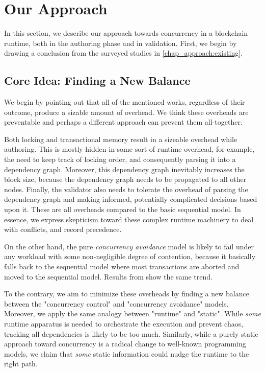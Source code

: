 \section{Our Approach} \label{chap_desgin:sec:our_approach}

In this section, we describe our approach towards concurrency in a blockchain runtime, both in the
authoring phase and in validation. First, we begin by drawing a conclusion from the surveyed studies
in \ref{chap_approach:existing}.

\subsection{Core Idea: Finding a New Balance}

We begin by pointing out that all of the mentioned works, regardless of their outcome, produce a
sizable amount of overhead. We think these overheads are preventable and perhaps a different
approach can prevent them all-together.

Both locking and transactional memory result in a sizeable overhead while authoring. This is mostly
hidden in some sort of runtime overhead, for example, the need to keep track of locking order, and
consequently parsing it into a dependency graph. Moreover, this dependency graph inevitably
increases the block size, because the dependency graph needs to be propagated to all other nodes.
Finally, the validator also needs to tolerate the overhead of parsing the dependency graph and
making informed, potentially complicated decisions based upon it. These are all overheads compared
to the basic sequential model. In essence, we express skepticism toward these complex runtime
machinery to deal with conflicts, and record precedence.

On the other hand, the pure \textit{concurrency avoidance} model is likely to fail under any
workload with some non-negligible degree of contention, because it basically falls back to the
sequential model where most transactions are aborted and moved to the sequential model. Results from
\cite{saraphEmpiricalStudySpeculative2019} show the same trend.

To the contrary, we aim to minimize these overheads by finding a new balance between the
"concurrency control" and "concurrency avoidance" models. Moreover, we apply the same analogy
between "runtime" and "static". While \textit{some} runtime apparatus is needed to orchestrate the
execution and prevent chaos, tracking all dependencies is likely to be too much. Similarly, while a
purely static approach toward concurrency is a radical change to well-known programming models, we
claim that \textit{some} static information could nudge the runtime to the right path.

